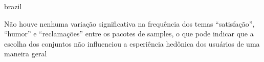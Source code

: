 \begin{otherlanguage*}{brazil}

Não houve nenhuma variação significativa na frequência dos temas ``satisfação'', ``humor'' e ``reclamações'' entre os pacotes de samples, o que pode indicar que a escolha dos conjuntos não influenciou a esperiência hedônica dos usuários de uma maneira geral








\end{otherlanguage*}
